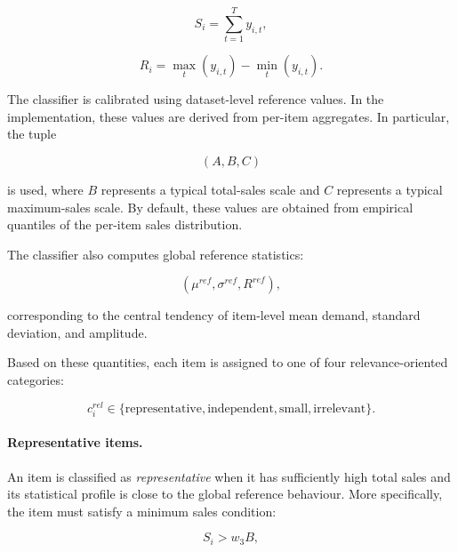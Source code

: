 \begin{equation}
    S_i = \sum_{t=1}^{T} y_{i,t},
    \label{eq:total_sales_item}
\end{equation}

\begin{equation}
    R_i = \max_t(y_{i,t}) - \min_t(y_{i,t}).
    \label{eq:item_amplitude}
\end{equation}

The classifier is calibrated using dataset-level reference values. In the implementation, these values are derived from per-item aggregates. In particular, the tuple

\begin{equation}
    (A, B, C)
    \label{eq:abc_tuple}
\end{equation}

is used, where \(B\) represents a typical total-sales scale and \(C\) represents a typical maximum-sales scale. By default, these values are obtained from empirical quantiles of the per-item sales distribution.

The classifier also computes global reference statistics:

\begin{equation}
    (\mu^{ref}, \sigma^{ref}, R^{ref}),
    \label{eq:reference_stats}
\end{equation}

corresponding to the central tendency of item-level mean demand, standard deviation, and amplitude.

Based on these quantities, each item is assigned to one of four relevance-oriented categories:

\begin{equation}
    c_i^{rel} \in
    \{
    \text{representative},
    \text{independent},
    \text{small},
    \text{irrelevant}
    \}.
    \label{eq:relevance_classes}
\end{equation}

\paragraph{Representative items.}
An item is classified as \textit{representative} when it has sufficiently high total sales and its statistical profile is close to the global reference behaviour. More specifically, the item must satisfy a minimum sales condition:

\begin{equation}
    S_i > w_3 B,
    \label{eq:representative_sales_condition}
\end{equation}

